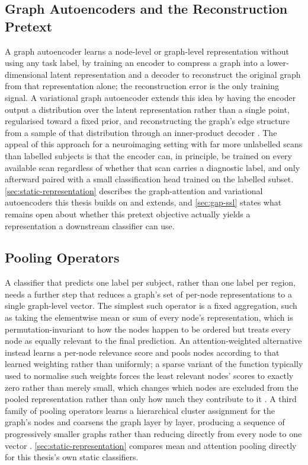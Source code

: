 \subsection{Graph Autoencoders and the Reconstruction Pretext}\label{sec:graph-autoencoders-background}

A graph autoencoder learns a node-level or graph-level representation without using any
task label, by training an encoder to compress a graph into a lower-dimensional latent
representation and a decoder to reconstruct the original graph from that representation
alone; the reconstruction error is the only training signal. A variational graph
autoencoder extends this idea by having the encoder output a distribution over the latent
representation rather than a single point, regularised toward a fixed prior, and
reconstructing the graph's edge structure from a sample of that distribution through an
inner-product decoder \parencite{kipf2016vgae}. The appeal of this approach for a
neuroimaging setting with far more unlabelled scans than labelled subjects is that the
encoder can, in principle, be trained on every available scan regardless of whether that
scan carries a diagnostic label, and only afterward paired with a small classification head
trained on the labelled subset. \autoref{sec:static-representation} describes the
graph-attention and variational autoencoders this thesis builds on and extends, and
\autoref{sec:gap-ssl} states what remains open about whether this pretext objective
actually yields a representation a downstream classifier can use.

\subsection{Pooling Operators}\label{sec:pooling-background}

A classifier that predicts one label per subject, rather than one label per region, needs
a further step that reduces a graph's set of per-node representations to a single
graph-level vector. The simplest such operator is a fixed aggregation, such as taking the
elementwise mean or sum of every node's representation, which is permutation-invariant to
how the nodes happen to be ordered but treats every node as equally relevant to the final
prediction. An attention-weighted alternative instead learns a per-node relevance score and
pools nodes according to that learned weighting rather than uniformly; a sparse variant of
the function typically used to normalise such weights forces the least relevant nodes'
scores to exactly zero rather than merely small, which changes which nodes are excluded
from the pooled representation rather than only how much they contribute to it
\parencite{martins2016sparsemax}. A third family of pooling operators learns a hierarchical
cluster assignment for the graph's nodes and coarsens the graph layer by layer, producing a
sequence of progressively smaller graphs rather than reducing directly from every node to
one vector \parencite{ying2018diffpool}. \autoref{sec:static-representation} compares mean
and attention pooling directly for this thesis's own static classifiers.

